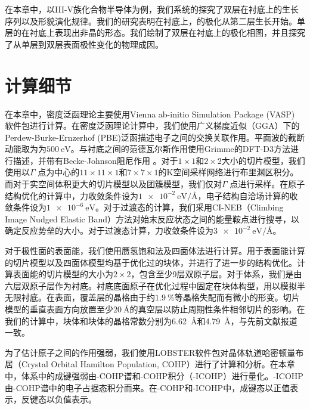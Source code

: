 在本章中，以III-V族化合物半导体为例，我们系统的探究了双层在衬底上的生长序列以及形貌演化规律。我们的研究表明在衬底上，的极化从第二层生长开始。单层的在衬底上表现出非晶的形态。我们绘制了双层在衬底上的极化相图，并且探究了从单层到双层表面极性变化的物理成因。
\section{计算细节}
在本章中，密度泛函理论主要使用Vienna ab-initio Simulation Package (VASP) 软件包进行计算。在密度泛函理论计算中，我们使用广义梯度近似（GGA）下的Perdew-Burke-Ernzerhof (PBE)泛函描述电子之间的交换关联作用。平面波的截断动能取为为$\SI{500}{\electronvolt}$。与衬底之间的范德瓦尔斯作用使用Grimme的DFT-D3方法进行描述，并带有Becke-Johnson阻尼作用 。对于$1 \times 1$和$2 \times 2$大小的切片模型，我们使用以$\Gamma$ 点为中心的$11 \times 11 \times 1$和$7 \times 7 \times 1$的K空间采样网络进行布里渊区积分。而对于实空间体积更大的切片模型以及团簇模型，我们仅对$\Gamma$ 点进行采样。在原子结构优化的计算中，力收敛条件设为$\SI{1e-2}{\electronvolt \per \angstrom}$，电子结构自洽场计算的收敛条件设为$\SI{1e-6}{\electronvolt}$。对于过渡态的计算，我们采用CI-NEB（Climbing Image Nudged Elastic Band）方法对始末反应状态之间的能量鞍点进行搜寻，以确定反应势垒的大小。对于过渡态计算，力收敛条件设为$\SI{3e-2}{\electronvolt \per \angstrom}$。

对于极性面的表面能，我们使用赝氢饱和法及四面体法进行计算。用于表面能计算的切片模型以及四面体模型均基于优化过的块体，并进行了进一步的结构优化。计算表面能的切片模型的大小为$2 \times 2$，包含至少9层双原子层。对于体系，我们是由六层双原子层作为衬底。衬底底面原子在优化过程中固定在块体构型，用以模拟半无限衬底。在表面，覆盖层的晶格由于约$\SI{1.9}{\percent}$等晶格失配而有微小的形变。切片模型的垂直表面方向放置至少$\SI{20}{\angstrom}$的真空层以防止周期性条件相邻切片的影响。在我们的计算中，块体和块体的晶格常数分别为\SI{6.62}{\angstrom}和\SI{4.79}{\angstrom}，与先前文献报道一致。

为了估计原子之间的作用强弱，我们使用LOBSTER软件包对晶体轨道哈密顿量布居（Crystal Orbital Hamilton Population, COHP）进行了计算和分析。在本章中，体系中的成键强弱由-COHP谱和-COHP积分（-ICOHP）进行量化。-ICOHP由-COHP谱中的电子占据态积分而来。在-COHP和-ICOHP中，成键态以正值表示，反键态以负值表示。

